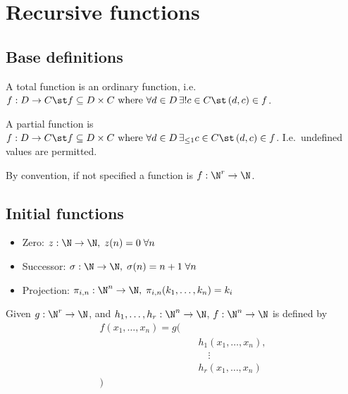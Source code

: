 \documentclass{article}
\begin{document}
\section{Recursive functions}
\subsection{Base definitions}
\begin{definition}
    A total function is an ordinary function, i.e.
    \(f: D\to C \st f\subseteq D\times C \text{ where }
    \forall d \in D \,\exists! c\in C \st \left( d, c \right)\in f\).
\end{definition}
\begin{definition}
    A partial function is \(f: D\to C \st f\subseteq D\times C \text{ where }
    \forall d \in D \,\exists_{\leq 1} c\in C \st \left( d, c \right)\in f\).
    I.e.\ undefined values are permitted.
\end{definition}
\begin{note}
    By convention, if not specified a function is \(f:\N^r\to\N\).
\end{note}

\subsection{Initial functions}
\begin{itemize}
    \item Zero: \(z:\N\to\N,\; z(n) = 0 \;\forall n\)
    \item Successor: \(\sigma:\N\to\N,\; \sigma(n) = n + 1 \;\forall n\)
    \item Projection: \(\pi_{i,n}:\N^n\to\N,\; \pi_{i,n}(k_1,\ldots,k_n) = k_i\)
\end{itemize}
\begin{definition}[Composition]
    Given \(g:\N^r\to\N\), and
    \(h_1,\ldots,h_r:\N^n\to\N\),
    \(f:\N^n\to\N\) is defined by
    \begin{align*}
        f(x_1,\ldots,x_n) 
        = g(& \\
        &\quad h_1(x_1,\ldots,x_n), \\
        &\qquad \vdots \\
        &\quad h_r(x_1,\ldots,x_n) \\
        )
    \end{align*}
\end{definition}
\end{document}
